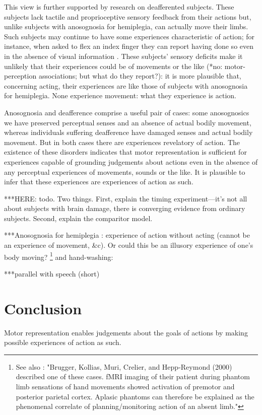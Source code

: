 \documentclass[12pt,\papersize]{extarticle}
\begin{document}
This view is further supported by research on deafferented subjects.  These subjects lack tactile and proprioceptive sensory feedback from their actions but, unlike subjects with anosognosia for hemiplegia, can actually move their limbs.  Such subjects may continue to have some experiences characteristic of action; for instance, when asked to flex an index finger they can report having done so even in the absence of visual information \citep{kristeva:2006}.  These subjects' sensory deficits make it unlikely that their experiences could be of movements or the like (*no: motor-perception associations; but what do they report?): it is more plausible that, concerning acting, their experiences are like those of subjects with anosognosia for hemiplegia.  None experience movement: what they experience is action.

Anosognosia and deafference comprise a useful pair of cases: some anosognosics we have preserved perceptual senses and an absence of actual bodily movement, whereas individuals suffering deafference have damaged senses and actual bodily movement.  But in both cases there are experiences revelatory of action.  The existence of these disorders indicates that motor representation is sufficient for experiences capable of grounding judgements about actions even in the absence of any perceptual experiences of movements, sounds or the like.  It is plausible to infer that these experiences are experiences of action as such.

***HERE: todo.  Two things.  First, explain the timing experiment---it's not all about subjects with brain damage, there is converging evidence from ordinary subjects.  Second, explain the comparitor model.  

***Anosognosia for hemiplegia : experience of action without acting (cannot be an experience of movement, \&c).  Or could this be an illusory experience of one's body moving?  \citep{garbarini:2012_moving}%
\footnote{
See also \citet{gallese:2010_bodily}: "Brugger, Kollias, Muri, Crelier, and Hepp-Reymond (2000) described one of these cases. fMRI imaging of their patient during phantom limb sensations of hand movements showed activation of premotor and posterior parietal cortex. Aplasic phantoms can therefore be explained as the phenomenal correlate of planning/monitoring action of an absent limb."}
and hand-washing: \citep{berti:2008_motor}

***parallel with speech (short)



\section{Conclusion}
Motor representation enables judgements about the goals of actions by making possible experiences of action as such.  
\end{document}
